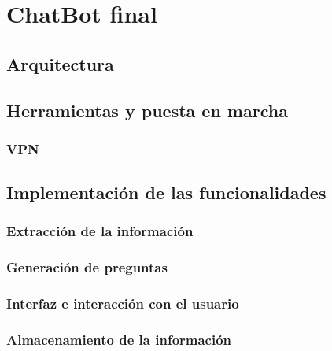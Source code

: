 \chapter{ChatBot final}
\label{cap:ChatBot final}
\section{Arquitectura}
\section{Herramientas y puesta en marcha}
\subsection{VPN}
\section{Implementación de las funcionalidades}
\subsection{Extracción de la información}
\subsection{Generación de preguntas}
\subsection{Interfaz e interacción con el usuario}
\subsection{Almacenamiento de la información}

